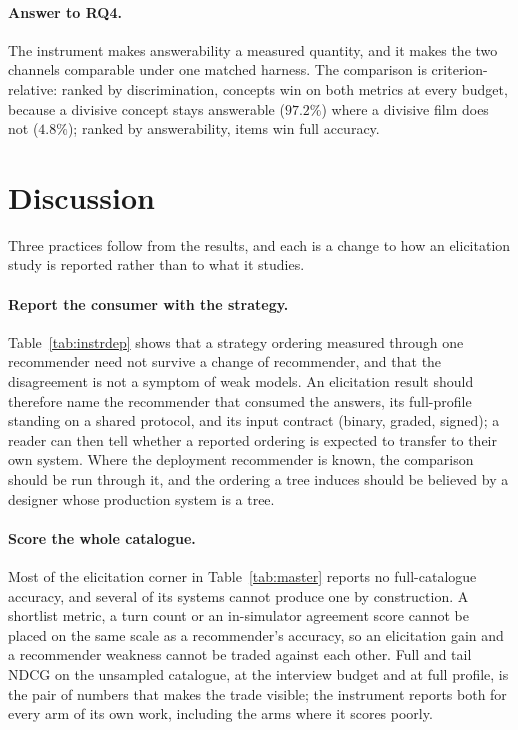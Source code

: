 \documentclass[manuscript,screen,review]{acmart}
\begin{document}
\paragraph{Answer to RQ4.} The instrument makes answerability a measured quantity, and it makes the two channels comparable under one matched harness. The comparison is criterion-relative: ranked by discrimination, concepts win on both metrics at every budget, because a divisive concept stays answerable ($97.2\%$) where a divisive film does not ($4.8\%$); ranked by answerability, items win full accuracy.

\section{Discussion}\label{sec:discussion}

Three practices follow from the results, and each is a change to how an elicitation study is reported rather than to what it studies.

\paragraph{Report the consumer with the strategy.} Table~\ref{tab:instrdep} shows that a strategy ordering measured through one recommender need not survive a change of recommender, and that the disagreement is not a symptom of weak models. An elicitation result should therefore name the recommender that consumed the answers, its full-profile standing on a shared protocol, and its input contract (binary, graded, signed); a reader can then tell whether a reported ordering is expected to transfer to their own system. Where the deployment recommender is known, the comparison should be run through it, and the ordering a tree induces should be believed by a designer whose production system is a tree.

\paragraph{Score the whole catalogue.} Most of the elicitation corner in Table~\ref{tab:master} reports no full-catalogue accuracy, and several of its systems cannot produce one by construction. A shortlist metric, a turn count or an in-simulator agreement score cannot be placed on the same scale as a recommender's accuracy, so an elicitation gain and a recommender weakness cannot be traded against each other. Full and tail NDCG on the unsampled catalogue, at the interview budget and at full profile, is the pair of numbers that makes the trade visible; the instrument reports both for every arm of its own work, including the arms where it scores poorly.
\end{document}

